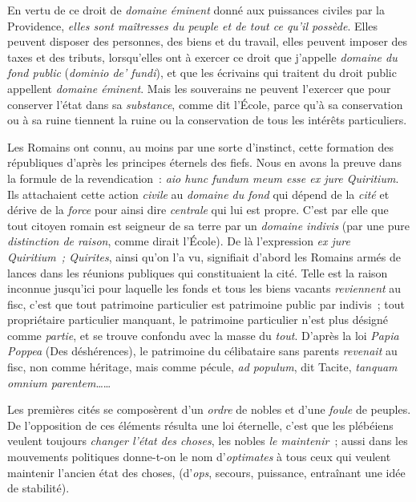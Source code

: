 \documentclass[french,twoside]{book} %
\begin{document}
En vertu de ce droit de {\itshape domaine éminent} donné aux puissances civiles par la Providence, {\itshape elles sont maîtresses du peuple et de tout ce qu’il possède}. Elles peuvent disposer des personnes, des biens et  du travail, elles peuvent imposer des taxes et des tributs, lorsqu’elles ont à exercer ce droit que j’appelle {\itshape domaine du fond public} ({\itshape dominio de’ fundi}), et que les écrivains qui traitent du droit public appellent {\itshape domaine éminent}. Mais les souverains ne peuvent l’exercer que pour conserver l’état dans sa {\itshape substance}, comme dit l’École, parce qu’à sa conservation ou à sa ruine tiennent la ruine ou la conservation de tous les intérêts particuliers.\par
Les Romains ont connu, au moins par une sorte d’instinct, cette formation des républiques d’après les principes éternels des fiefs. Nous en avons la preuve dans la formule de la revendication : \emph{{\itshape aio hunc fundum meum esse ex jure Quiritium}}. Ils attachaient cette action {\itshape civile} au {\itshape domaine du fond} qui dépend de la {\itshape cité} et dérive de la {\itshape force} pour ainsi dire {\itshape centrale} qui lui est propre. C’est par elle que tout citoyen romain est seigneur de sa terre par un {\itshape domaine indivis} (par une pure {\itshape distinction de raison}, comme dirait l’École). De là l’expression {\itshape ex jure Quiritium ; Quirites}, ainsi qu’on l’a vu, signifiait d’abord les Romains armés de lances dans les réunions publiques qui constituaient la cité. Telle est la raison inconnue jusqu’ici pour laquelle les fonds et tous les biens vacants {\itshape reviennent} au fisc, c’est que tout patrimoine particulier est patrimoine public par indivis ; tout propriétaire particulier manquant, le patrimoine particulier n’est plus désigné comme {\itshape partie}, et se trouve confondu avec la masse du {\itshape tout}. D’après la loi {\itshape Papia Poppea} (Des déshérences), le patrimoine  du célibataire sans parents {\itshape revenait} au fisc, non comme héritage, mais comme pécule, {\itshape ad populum}, dit Tacite, \emph{{\itshape tanquam omnium parentem}}……\par
Les premières cités se composèrent d’un {\itshape ordre} de nobles et d’une {\itshape foule} de peuples. De l’opposition de ces éléments résulta une loi éternelle, c’est que les plébéiens veulent toujours {\itshape changer l’état des choses}, les nobles {\itshape le maintenir} ; aussi dans les mouvements politiques donne-t-on le nom d’{\itshape optimates} à tous ceux qui veulent maintenir l’ancien état des choses, (d’{\itshape ops}, secours, puissance, entraînant une idée de stabilité).\par
\end{document}

